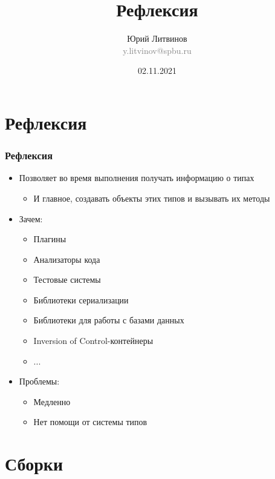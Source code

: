 \documentclass[xetex,mathserif,serif]{beamer}
\title{Рефлексия}
\author[Юрий Литвинов]{Юрий Литвинов\\\small{\textcolor{gray}{y.litvinov@spbu.ru}}}
\date{02.11.2021}
\begin{document}
    \frame{\titlepage}

    \section{Рефлексия}

    \begin{frame}
        \frametitle{Рефлексия}
        \begin{itemize}
            \item Позволяет во время выполнения получать информацию о типах
            \begin{itemize}
                \item И главное, создавать объекты этих типов и вызывать их методы
            \end{itemize}
            \item Зачем:
            \begin{itemize}
                \item Плагины
                \item Анализаторы кода
                \item Тестовые системы
                \item Библиотеки сериализации
                \item Библиотеки для работы с базами данных
                \item Inversion of Control-контейнеры
                \item ...
            \end{itemize}
            \item Проблемы:
            \begin{itemize}
                \item Медленно
                \item Нет помощи от системы типов
            \end{itemize}
        \end{itemize}
    \end{frame}

    \section{Сборки}
\end{document}
